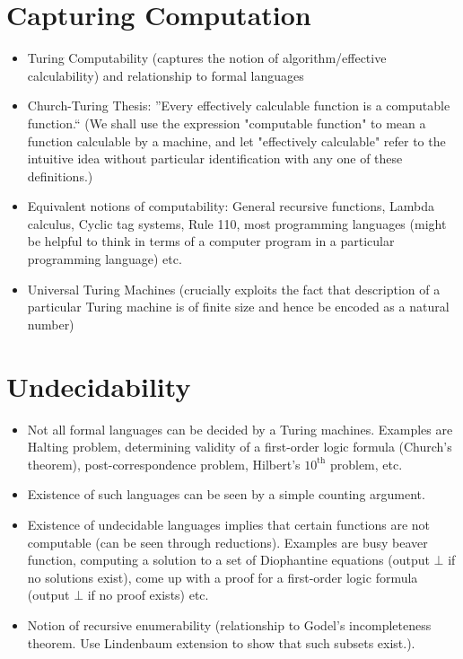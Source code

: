 \documentclass[
11pt,notheorems,hyperref={pdfauthor=whatever}
]{beamer}
\begin{document}
\section{Capturing Computation}
\begin{frame}
\begin{itemize}
    \setlength\itemsep{1em}
    \item Turing Computability (captures the notion of algorithm/effective calculability) and relationship to formal languages
    \item Church-Turing Thesis: ''Every effectively calculable function is a computable function.`` (We shall use the expression "computable function" to mean a function calculable by a machine, and let "effectively calculable" refer to the intuitive idea without particular identification with any one of these definitions.) \cite{turing1938systems}
    \item Equivalent notions of computability: General recursive functions, Lambda calculus, Cyclic tag systems, Rule 110, most programming languages (might be helpful to think in terms of a computer program in a particular programming language) etc.
    \item Universal Turing Machines (crucially exploits the fact that description of a particular Turing machine is of finite size and hence be encoded as a natural number)
\end{itemize}     
\end{frame}

\section{Undecidability}
\begin{frame}
\begin{itemize}
    \setlength\itemsep{1em}
    \item Not all formal languages can be decided by a Turing machines. Examples are Halting problem, determining validity of a first-order logic formula (Church's theorem), post-correspondence problem, Hilbert's $10^{\text{th}}$ problem, etc.
    \item Existence of such languages can be seen by a simple counting argument.
    \item Existence of undecidable languages implies that certain functions are not computable (can be seen through reductions). Examples are busy beaver function, computing a solution to a set of Diophantine equations (output $\bot$ if no solutions exist), come up with a proof for a first-order logic formula (output $\bot$ if no proof exists) etc.
    \item Notion of recursive enumerability (relationship to Godel's incompleteness theorem. Use Lindenbaum extension to show that such subsets exist.).
\end{itemize}     
\end{frame}
\end{document}
